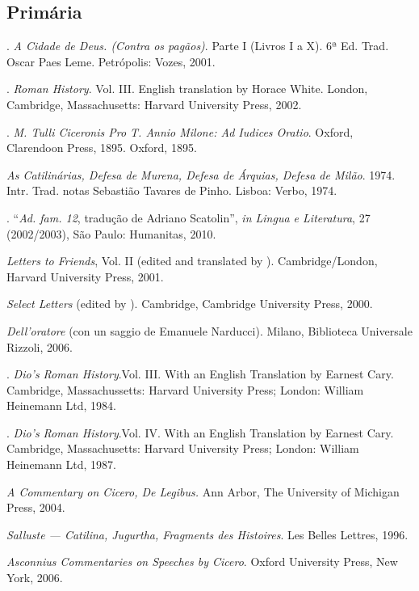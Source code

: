 \begin{bibliohedra}

\subsection{Primária}

. \emph{A Cidade de Deus. (Contra os pagãos)}. Parte I (Livros I a X). 6ª Ed. Trad. Oscar Paes Leme. Petrópolis: Vozes, 2001.

. \emph{Roman History}. Vol. III. English translation by Horace White. London, Cambridge, Massachusetts: Harvard University Press, 2002.

. \emph{M. Tulli Ciceronis Pro T. Annio Milone: Ad Iudices Oratio}. Oxford, Clarendoon Press, 1895. Oxford, 1895.


 \emph{As Catilinárias, Defesa de Murena, Defesa de Árquias, Defesa de Milão}. 1974. Intr. Trad. notas Sebastião Tavares de Pinho. Lisboa: Verbo, 1974.

. ``\emph{Ad. fam. 12}, tradução de Adriano Scatolin'', \emph{in Lingua e Literatura}, 27 (2002/2003), São Paulo: Humanitas, 2010.

 \emph{Letters to Friends}, Vol. II (edited and translated by ). Cambridge/London, Harvard University Press, 2001.

 \emph{Select Letters} (edited by ). Cambridge, Cambridge University Press, 2000.

 \emph{Dell’oratore} (con un saggio de Emanuele Narducci). Milano, Biblioteca Universale Rizzoli, 2006.

.  \emph{Dio’s Roman History}.Vol. III. With an English Translation by Earnest Cary.  Cambridge, Massachussetts: Harvard University Press; London: William Heinemann Ltd, 1984. 

.   \emph{Dio’s Roman History}.Vol. IV. With an English Translation by Earnest Cary.  Cambridge, Massachusetts: Harvard University Press; London: William Heinemann Ltd, 1987. 

 \emph{A Commentary on Cicero, \emph{De Legibus}.} Ann Arbor, The University of Michigan Press, 2004.


 \emph{Salluste --- Catilina, Jugurtha, Fragments des Histoires}. Les Belles Lettres, 1996.

 \emph{Asconnius Commentaries on Speeches by Cicero}. Oxford University Press, New York, 2006.



\end{bibliohedra}
